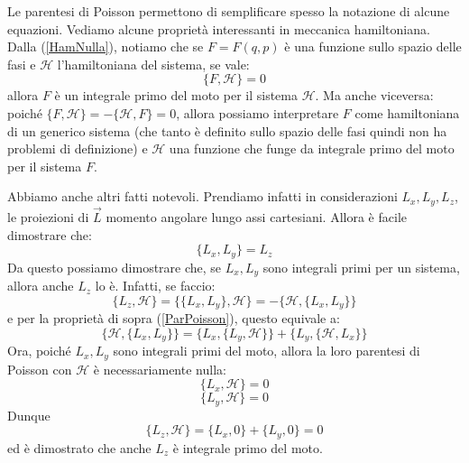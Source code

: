 \documentclass[a4paper,openany]{article}
\begin{document}
	
	Le parentesi di Poisson permettono di semplificare spesso la notazione di alcune equazioni. Vediamo alcune  proprietà interessanti in meccanica hamiltoniana. Dalla (\ref{HamNulla}), notiamo che se $F=F(q,p)$ è una funzione sullo spazio delle fasi e $\mathcal{H}$ l'hamiltoniana del sistema, se vale:
	\begin{equation}\label{key}
		\{F,\mathcal{H}\} = 0
	\end{equation}
	allora $F$ è un integrale primo del moto per il sistema $\mathcal{H}$. Ma anche viceversa: poiché $\{F,\mathcal{H}\} = -\{\mathcal{H},F\} = 0$, allora possiamo interpretare $F$ come hamiltoniana di un generico sistema (che tanto è definito sullo spazio delle fasi quindi non ha problemi di definizione) e $\mathcal{H}$ una funzione che funge da integrale primo del moto per il sistema $F$.
	
	Abbiamo anche altri fatti notevoli. Prendiamo infatti in considerazioni $L_x,L_y,L_z$, le proiezioni di $\vec{
		L}$ momento angolare lungo assi cartesiani. Allora è facile dimostrare che:
	\begin{equation}\label{key}
		\{L_x,L_y\} = L_z 
	\end{equation}
	Da questo possiamo dimostrare che, se $L_x, L_y$ sono integrali primi per un sistema, allora anche $L_z$ lo è. Infatti, se faccio:
	\begin{equation}\label{key}
		\{L_z, \mathcal{H}\} = \{\{L_x,L_y\},\mathcal{H}\} = -\{\mathcal{H},\{L_x,L_y\}\}
	\end{equation}
	e per la proprietà di sopra (\ref{ParPoisson}), questo equivale a:
	\begin{equation}\label{key}
		\{\mathcal{H},\{L_x,L_y\}\} = \{L_x,\{L_y,\mathcal{H}\}\} + \{L_y,\{\mathcal{H},L_x\}\}
	\end{equation}
	Ora, poiché $L_x, L_y$ sono integrali primi del moto, allora la loro parentesi di Poisson con $\mathcal{H}$ è necessariamente nulla:
	$$
	\{L_x,\mathcal{H}\} = 0
	$$
	$$
	\{L_y,\mathcal{H}\} = 0
	$$
	Dunque
	\begin{equation}\label{key}
		\{L_z, \mathcal{H}\} = \{L_x,0\} + \{L_y,0\} = 0
	\end{equation}
	ed è dimostrato che anche $L_z$ è integrale primo del moto.
\end{document}
